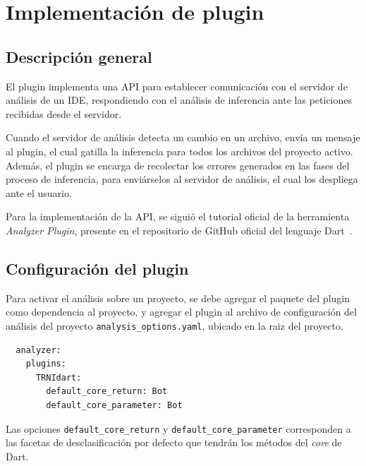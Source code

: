\section{Implementación de plugin}

\subsection{Descripción general}
El plugin implementa una API para establecer comunicación con el servidor de análisis de un IDE, respondiendo con el análisis de inferencia ante las peticiones recibidas desde el servidor.

Cuando el servidor de análisis detecta un cambio en un archivo, envía un mensaje al plugin, el cual gatilla la inferencia para todos los archivos del proyecto activo. Además, el plugin se encarga de recolectar los errores generados en las fases del proceso de inferencia, para enviárselos al servidor de análisis, el cual los despliega ante el usuario.

Para la implementación de la API, se siguió el tutorial oficial de la herramienta \textit{Analyzer Plugin}, presente en el repositorio de GitHub oficial del lenguaje Dart~\cite{plugin}.

\subsection{Configuración del plugin}
Para activar el análisis sobre un proyecto, se debe agregar el paquete del plugin como dependencia al proyecto, y agregar el plugin al archivo de configuración del análisis del proyecto \texttt{analysis\_options.yaml}, ubicado en la raiz del proyecto.

\begin{verbatim}
  analyzer:
    plugins:
      TRNIdart:
        default_core_return: Bot
        default_core_parameter: Bot
\end{verbatim}

Las opciones \texttt{default\_core\_return} y \texttt{default\_core\_parameter} corresponden a las facetas de desclasificación por defecto que tendrán los métodos del \textit{core} de Dart.
